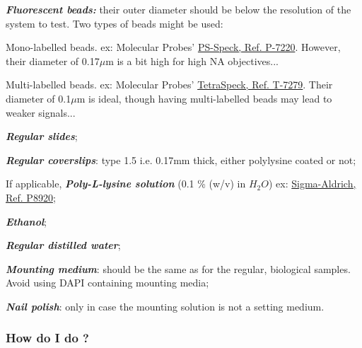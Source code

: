 \documentclass[a4paper, 11pt]{report}%
\begin{document}
\begin{itemize*}
	\item \textbf{\textit{Fluorescent beads:}} their outer diameter should be below the resolution of the system to test. Two types of beads might be used:
		\begin{itemize*}
			\item Mono-labelled beads. ex: Molecular Probes' \href{http://probes.invitrogen.com/media/pis/mp07220.pdf}{PS-Speck, Ref. P-7220}. However, their diameter of 0.17$\mu$m is a bit high for high NA objectives...
			\item Multi-labelled beads. ex: Molecular Probes' \href{http://probes.invitrogen.com/media/pis/mp07279.pdf}{TetraSpeck, Ref. T-7279}. Their diameter of 0.1$\mu$m is ideal, though having multi-labelled beads may lead to weaker signals...
		\end{itemize*}
	\item \textbf{\textit{Regular slides}};
	\item \textbf{\textit{Regular coverslips}}: type 1.5 i.e. 0.17mm thick, either polylysine coated or not;
	\item If applicable, \textbf{\textit{Poly-L-lysine solution}} (0.1 \% (w/v) in $H_{2}O$) ex: \href{http://www.sigmaaldrich.com/etc/medialib/docs/Sigma/generalinformation2/p8920.Par.0001.File.tmp/p8920.pdf}{Sigma-Aldrich, Ref. P8920};
	\item \textbf{\textit{Ethanol}};
	\item \textbf{\textit{Regular distilled water}};
	\item \textbf{\textit{Mounting medium}}: should be the same as for the regular, biological samples. Avoid using DAPI containing mounting media;
	\item \textbf{\textit{Nail polish}}: only in case the mounting solution is not a setting medium.
\end{itemize*}

\subsubsection{How do I do ?}
\label{sec:gpr-proto-how}
\end{document}
